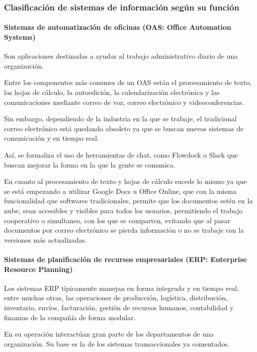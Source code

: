 \documentclass[a4paper, 12pt]{article}
\begin{document}
\subsubsection{Clasificación de sistemas de información según su función}
\label{ClasificacionFuncion}

\paragraph{Sistemas de automatización de oficinas (OAS: Office Automation Systems)}

Son aplicaciones destinadas a ayudar al trabajo administrativo diario de una organización. 

Entre los componentes más comunes de un OAS están el procesamiento de texto, las hojas de cálculo, la autoedición, la calendarización electrónica y las comunicaciones mediante correo de voz, correo electrónico y videoconferencias.

Sin embargo, dependiendo de la industria en la que se trabaje, el tradicional correo electrónico está quedando obsoleto ya que se buscan nuevos sistemas de comunicación y en tiempo real.

Así, se formaliza el uso de herramientas de chat, como Flowdock o Slack que buscan mejorar la forma en la que la gente se comunica.

En cuanto al procesamiento de texto y hojas de cálculo sucede lo mismo ya que se está empezando a utilizar Google Docs u Office Online, que con la misma funcionalidad que softwares tradicionales, permite que los documentos estén en la nube, sean accesibles y visibles para todos los usuarios, permitiendo el trabajo cooperativo o simultaneo,  con los que se comparten, evitando que al pasar documentos por correo electrónico se pierda información o no se trabaje con la versiones más actualizadas.

\paragraph{Sistemas de planificación de recursos empresariales (ERP: Enterprise Resource Planning)}

Los sistemas ERP típicamente manejan en forma integrada y en tiempo real, entre muchas otras, las operaciones de producción, logística, distribución, inventario, envíos, facturación, gestión de recursos humanos, contabilidad y finanzas de la compañía de forma modular. 

En su operación interactúan gran parte de los departamentos de una organización. Su base es la de los sistemas transaccionales ya comentados.
\end{document}
